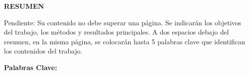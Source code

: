 \begin{centering}
\Large{\textbf{RESUMEN}}

\end{centering}

Pendiente: Su contenido no debe superar una página. Se indicarán los objetivos del trabajo, los métodos y resultados principales. A dos espacios debajo del resumen, en la misma página, se colocarán hasta 5 palabras clave que identifican los contenidos del trabajo.



\textbf{Palabras Clave:} 
